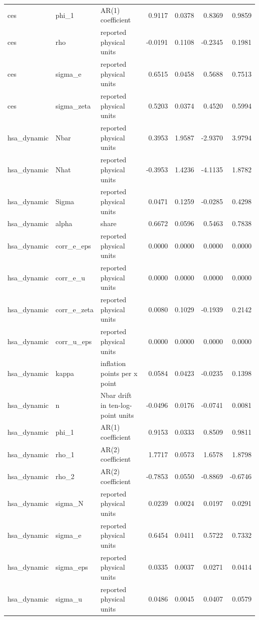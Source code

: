 \begin{tabular}{lllrrrr}
ces & phi\_1 & AR(1) coefficient & 0.9117 & 0.0378 & 0.8369 & 0.9859 \\
ces & rho & reported physical units & -0.0191 & 0.1108 & -0.2345 & 0.1981 \\
ces & sigma\_e & reported physical units & 0.6515 & 0.0458 & 0.5688 & 0.7513 \\
ces & sigma\_zeta & reported physical units & 0.5203 & 0.0374 & 0.4520 & 0.5994 \\
hsa\_dynamic & Nbar & reported physical units & 0.3953 & 1.9587 & -2.9370 & 3.9794 \\
hsa\_dynamic & Nhat & reported physical units & -0.3953 & 1.4236 & -4.1135 & 1.8782 \\
hsa\_dynamic & Sigma & reported physical units & 0.0471 & 0.1259 & -0.0285 & 0.4298 \\
hsa\_dynamic & alpha & share & 0.6672 & 0.0596 & 0.5463 & 0.7838 \\
hsa\_dynamic & corr\_e\_eps & reported physical units & 0.0000 & 0.0000 & 0.0000 & 0.0000 \\
hsa\_dynamic & corr\_e\_u & reported physical units & 0.0000 & 0.0000 & 0.0000 & 0.0000 \\
hsa\_dynamic & corr\_e\_zeta & reported physical units & 0.0080 & 0.1029 & -0.1939 & 0.2142 \\
hsa\_dynamic & corr\_u\_eps & reported physical units & 0.0000 & 0.0000 & 0.0000 & 0.0000 \\
hsa\_dynamic & kappa & inflation points per x point & 0.0584 & 0.0423 & -0.0235 & 0.1398 \\
hsa\_dynamic & n & Nbar drift in ten-log-point units & -0.0496 & 0.0176 & -0.0741 & 0.0081 \\
hsa\_dynamic & phi\_1 & AR(1) coefficient & 0.9153 & 0.0333 & 0.8509 & 0.9811 \\
hsa\_dynamic & rho\_1 & AR(2) coefficient & 1.7717 & 0.0573 & 1.6578 & 1.8798 \\
hsa\_dynamic & rho\_2 & AR(2) coefficient & -0.7853 & 0.0550 & -0.8869 & -0.6746 \\
hsa\_dynamic & sigma\_N & reported physical units & 0.0239 & 0.0024 & 0.0197 & 0.0291 \\
hsa\_dynamic & sigma\_e & reported physical units & 0.6454 & 0.0411 & 0.5722 & 0.7332 \\
hsa\_dynamic & sigma\_eps & reported physical units & 0.0335 & 0.0037 & 0.0271 & 0.0414 \\
hsa\_dynamic & sigma\_u & reported physical units & 0.0486 & 0.0045 & 0.0407 & 0.0579 \\

\end{tabular}
